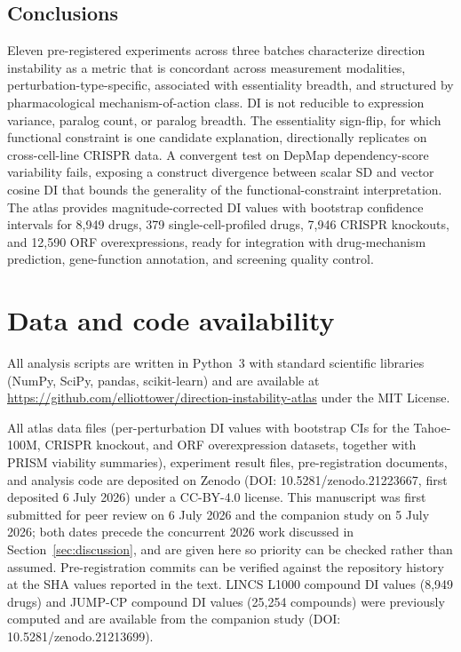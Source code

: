 \documentclass[11pt]{article}
\begin{document}
\subsection{Conclusions}

Eleven pre-registered experiments across three batches characterize
direction instability as a metric that is concordant across measurement
modalities, perturbation-type-specific, associated with essentiality
breadth, and structured by pharmacological mechanism-of-action class.  DI
is not reducible to expression variance, paralog count, or paralog
breadth.  The essentiality sign-flip, for which functional constraint is
one candidate explanation, directionally replicates on cross-cell-line
CRISPR data.  A
convergent test on DepMap dependency-score variability fails, exposing a
construct divergence between scalar SD and vector cosine DI that
bounds the generality of the functional-constraint interpretation.  The
atlas provides magnitude-corrected DI values with bootstrap confidence
intervals for 8{,}949 drugs, 379 single-cell-profiled drugs, 7{,}946
CRISPR knockouts, and 12{,}590 ORF overexpressions, ready for
integration with drug-mechanism prediction, gene-function annotation,
and screening quality control.



\section*{Data and code availability}
All analysis scripts are written in Python~3 with standard scientific
libraries (NumPy, SciPy, pandas, scikit-learn) and are available at
\url{https://github.com/elliottower/direction-instability-atlas} under
the MIT License.

All atlas data files (per-perturbation DI values with bootstrap CIs for
the Tahoe-100M, CRISPR knockout, and ORF overexpression datasets, together
with PRISM viability summaries), experiment result files, pre-registration
documents, and analysis code are deposited on Zenodo
(DOI: 10.5281/zenodo.21223667, first deposited 6 July 2026) under a CC-BY-4.0
license.  This manuscript was first submitted for peer review on 6 July 2026 and
the companion study on 5 July 2026; both dates precede the concurrent 2026 work
discussed in Section~\ref{sec:discussion}, and are given here so priority can be
checked rather than assumed.
Pre-registration commits can be verified against the repository history
at the SHA values reported in the text.  LINCS L1000 compound DI values
(8{,}949 drugs) and JUMP-CP compound DI values (25{,}254 compounds)
were previously computed and are available from the companion study
(DOI: 10.5281/zenodo.21213699).
\end{document}
